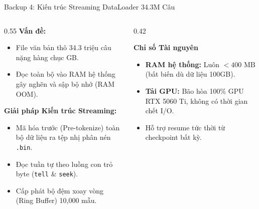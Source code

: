\documentclass[aspectratio=169, 10pt]{beamer}
\begin{document}
\begin{frame}{Backup 4: Kiến trúc Streaming DataLoader 34.3M Câu}
  \begin{columns}
    \begin{column}{0.55\textwidth}
      \textbf{Vấn đề:}
      \begin{itemize}
        \item File văn bản thô 34.3 triệu câu nặng hàng chục GB.
        \item Đọc toàn bộ vào RAM hệ thống gây nghẽn và sập bộ nhớ (RAM OOM).
      \end{itemize}
      \vspace{0.2cm}
      \textbf{Giải pháp Kiến trúc Streaming:}
      \begin{itemize}
        \item Mã hóa trước (Pre-tokenize) toàn bộ dữ liệu ra tệp nhị phân nén \texttt{.bin}.
        \item Đọc tuần tự theo luồng con trỏ byte (\texttt{tell} \& \texttt{seek}).
        \item Cấp phát bộ đệm xoay vòng (Ring Buffer) 10,000 mẫu.
      \end{itemize}
    \end{column}
    \begin{column}{0.42\textwidth}
      \begin{exampleblock}{\textbf{Chỉ số Tài nguyên}}
        \begin{itemize}
          \item \textbf{RAM hệ thống:} Luôn $< 400\text{ MB}$ (bất biến dù dữ liệu 100GB).
          \item \textbf{Tải GPU:} Bão hòa 100\% GPU RTX 5060 Ti, không có thời gian chết I/O.
          \item Hỗ trợ resume tức thời từ checkpoint bất kỳ.
        \end{itemize}
      \end{exampleblock}
    \end{column}
  \end{columns}
\end{frame}
\end{document}
